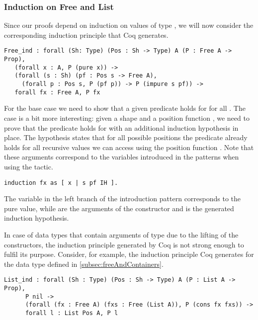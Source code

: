 \subsubsection{Induction on Free and List}

Since our proofs depend on induction on values of type , we will now consider the corresponding induction principle that Coq generates.

\begin{verbatim}
Free_ind : forall (Sh: Type) (Pos : Sh -> Type) A (P : Free A -> Prop),
   (forall x : A, P (pure x)) ->
   (forall (s : Sh) (pf : Pos s -> Free A),
     (forall p : Pos s, P (pf p)) -> P (impure s pf)) ->
   forall fx : Free A, P fx
\end{verbatim}

For the base case we need to show that a given predicate  holds for  for all .
The  case is a bit more interesting: given a shape  and a position function , we need to prove that the predicate holds for  with an additional induction hypothesis in place.
The hypothesis states that for all possible positions  the predicate already holds for all recursive values we can access using the position function .
Note that these arguments correspond to the variables introduced in the patterns when using the  tactic.

\begin{verbatim}
induction fx as [ x | s pf IH ].
\end{verbatim}

The variable  in the left branch of the introduction pattern corresponds to the pure value, while   are the arguments of the  constructor and  is the generated induction hypothesis.

In case of data types that contain arguments of type  due to the lifting of the constructors, the induction principle generated by Coq is not strong enough to fulfil its purpose.
Consider, for example, the induction principle Coq generates for the  data type defined in \autoref{subsec:freeAndContainers}.

\begin{verbatim}
List_ind : forall (Sh : Type) (Pos : Sh -> Type) A (P : List A -> Prop),
      P nil ->
      (forall (fx : Free A) (fxs : Free (List A)), P (cons fx fxs)) ->
      forall l : List Pos A, P l
\end{verbatim}

